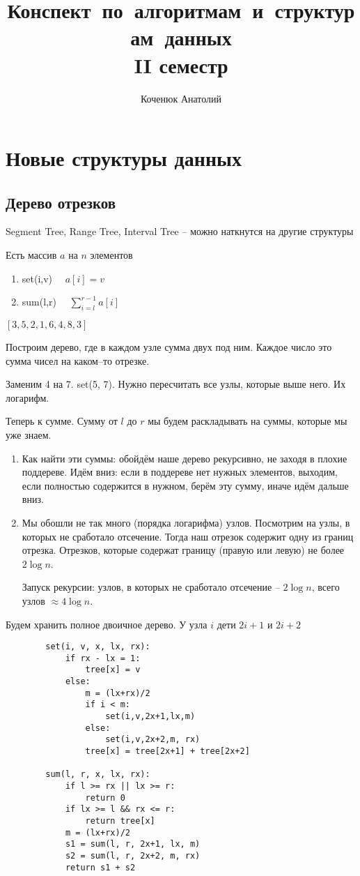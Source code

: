 \documentclass{book}
\author{Коченюк Анатолий}
\title{Конспект~по~алгоритмам~и~структурам~данных\\ II семестр}
\theoremstyle{definition}
\begin{document}
    \maketitle
    \chapter{Новые структуры данных}
    \section{Дерево отрезков}

    Segment Tree, Range Tree, Interval Tree -- можно наткнутся на другие структуры

    Есть массив $a$ на  $n$ элементов
     \begin{enumerate}
         \item set(i,v) $\quad a[i] = v$
         \item sum(l,r)  $\quad \sum_{i=l}^{r-1} a[i]$
    \end{enumerate}

    $\left[ 3,5,2,1,6,4,8,3 \right] $

    Построим дерево, где в каждом узле сумма двух под ним. Каждое число это сумма чисел на каком--то отрезке.

    Заменим 4 на 7. set(5, 7). Нужно пересчитать все узлы, которые выше него. Их логарифм.

    Теперь к сумме. Сумму от  $l $ до  $r$ мы будем раскладывать на суммы, которые мы уже знаем.
     \begin{enumerate}
        \item Как найти эти суммы: обойдём наше дерево рекурсивно, не заходя в плохие поддереве. Идём вниз: если в поддереве нет нужных элементов, выходим, если полностью содержится в нужном, берём эту сумму, иначе идём дальше вниз.
        \item Мы обошли не так много (порядка логарифма) узлов. Посмотрим на узлы, в которых не сработало отсечение. Тогда наш отрезок содержит одну из границ отрезка. Отрезков, которые содержат границу (правую или левую) не более $2\log n$. 

            Запуск рекурсии: узлов, в которых не сработало отсечение -- $2\log n$, всего узлов $\approx 4\log n$.
    \end{enumerate}

    Будем хранить полное двоичное дерево. У узла $i$ дети  $2i+1$ и  $2i+2$

    \begin{verbatim}
        set(i, v, x, lx, rx):
            if rx - lx = 1:
                tree[x] = v
            else:
                m = (lx+rx)/2
                if i < m:
                    set(i,v,2x+1,lx,m)
                else:
                    set(i,v,2x+2,m, rx)
                tree[x] = tree[2x+1] + tree[2x+2]

        sum(l, r, x, lx, rx):
            if l >= rx || lx >= r:
                return 0
            if lx >= l && rx <= r:
                return tree[x]
            m = (lx+rx)/2
            s1 = sum(l, r, 2x+1, lx, m)
            s2 = sum(l, r, 2x+2, m, rx)
            return s1 + s2
    \end{verbatim}
\end{document}

